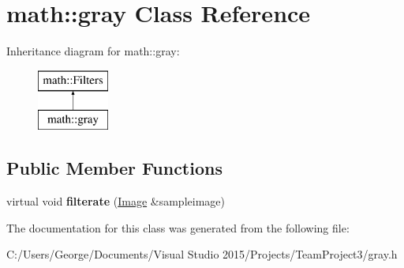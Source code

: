 \hypertarget{classmath_1_1gray}{}\section{math\+:\+:gray Class Reference}
\label{classmath_1_1gray}
Inheritance diagram for math\+:\+:gray\+:\begin{figure}[H]
\begin{center}
\leavevmode
\includegraphics[height=2.000000cm]{classmath_1_1gray}
\end{center}
\end{figure}
\subsection*{Public Member Functions}
\begin{DoxyCompactItemize}
\item 
\mbox{\label{classmath_1_1gray_aae9a8d291e2779e232d8f7231b531364}} 
virtual void {\bfseries filterate} (\hyperlink{classmath_1_1_image}{Image} \&sampleimage)
\end{DoxyCompactItemize}


The documentation for this class was generated from the following file\+:\begin{DoxyCompactItemize}
\item 
C\+:/\+Users/\+George/\+Documents/\+Visual Studio 2015/\+Projects/\+Team\+Project3/gray.\+h\end{DoxyCompactItemize}
